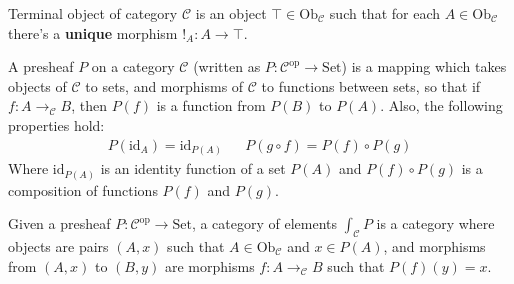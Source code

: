 \begin{definition}
Terminal object of category $\mathcal{C}$ is an object
$\top\in\mathrm{Ob}_\mathcal{C}$ such that for each
$A\in\mathrm{Ob}_\mathcal{C}$ there's a \textbf{unique}
morphism $!_A:A\to\top$.
\end{definition}

\begin{definition}[Presheaf]
A presheaf $P$ on a category $\mathcal{C}$ (written as
$P:\mathcal{C}^\mathrm{op}\to\mathrm{Set}$) is a mapping
which takes objects of $\mathcal{C}$ to sets, and
morphisms of $\mathcal{C}$ to functions between sets, so
that if $f:A\to_\mathcal{C} B$, then $P(f)$ is a
function from $P(B)$ to $P(A)$. Also, the following
properties hold:
\begin{align*}
    P(\mathrm{id}_A)=\mathrm{id}_{P(A)} & &
    P(g\circ f)=P(f)\circ P(g)
\end{align*}
Where $\mathrm{id}_{P(A)}$ is an identity function of a
set $P(A)$ and $P(f)\circ P(g)$ is a composition of
functions $P(f)$ and $P(g)$.
\end{definition}

\begin{definition}
Given a presheaf $P:\mathcal{C}^\mathrm{op}\to
\mathrm{Set}$, a category of elements
$\int_\mathcal{C}P$ is a category where objects are
pairs $(A, x)$ such that $A\in\mathrm{Ob}_\mathcal{C}$
and $x\in P(A)$, and morphisms from $(A, x)$ to $(B, y)$
are morphisms $f:A\to_\mathcal{C} B$ such that
$P(f)(y)=x$.
\end{definition}

